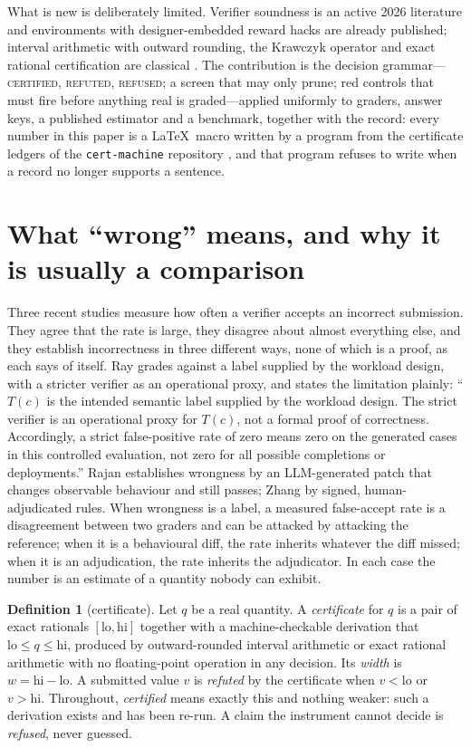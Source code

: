 \documentclass[11pt]{article}
\theoremstyle{definition}
\newtheorem{definition}{Definition}
\newcommand{\lo}{\mathrm{lo}}
\newcommand{\hi}{\mathrm{hi}}
\newcommand{\verdict}[1]{\textsc{#1}}
\begin{document}
What is new is deliberately limited. Verifier soundness is an active 2026 literature \cite{Rajan26,Zhang26,Gaming26,Ray26} and environments with designer-embedded reward hacks are already published; interval arithmetic with outward rounding, the Krawczyk operator and exact rational certification are classical \cite{Krawczyk69,Moore09,Rump10}. The contribution is the decision grammar---\verdict{certified}, \verdict{refuted}, \verdict{refused}; a screen that may only prune; red controls that must fire before anything real is graded---applied uniformly to graders, answer keys, a published estimator and a benchmark, together with the record: every number in this paper is a \LaTeX\ macro written by a program from the certificate ledgers of the \texttt{cert-machine} repository \cite{CM}, and that program refuses to write when a record no longer supports a sentence.

\section{What ``wrong'' means, and why it is usually a comparison}\label{sec:wrong}

Three recent studies measure how often a verifier accepts an incorrect submission. They agree that the rate is large, they disagree about almost everything else, and they establish incorrectness in three different ways, none of which is a proof, as each says of itself. Ray \cite{Ray26} grades against a label supplied by the workload design, with a stricter verifier as an operational proxy, and states the limitation plainly: ``$T(c)$ is the intended semantic label supplied by the workload design. The strict verifier is an operational proxy for $T(c)$, not a formal proof of correctness. Accordingly, a strict false-positive rate of zero means zero on the generated cases in this controlled evaluation, not zero for all possible completions or deployments.'' Rajan \cite{Rajan26} establishes wrongness by an LLM-generated patch that changes observable behaviour and still passes; Zhang \cite{Zhang26} by signed, human-adjudicated rules. When wrongness is a label, a measured false-accept rate is a disagreement between two graders and can be attacked by attacking the reference; when it is a behavioural diff, the rate inherits whatever the diff missed; when it is an adjudication, the rate inherits the adjudicator. In each case the number is an estimate of a quantity nobody can exhibit.

\begin{definition}[certificate]\label{def:cert}
Let $q$ be a real quantity. A \emph{certificate} for $q$ is a pair of exact rationals $[\lo,\hi]$ together with a machine-checkable derivation that $\lo\le q\le\hi$, produced by outward-rounded interval arithmetic or exact rational arithmetic with no floating-point operation in any decision. Its \emph{width} is $w=\hi-\lo$. A submitted value $v$ is \emph{refuted} by the certificate when $v<\lo$ or $v>\hi$. Throughout, \emph{certified} means exactly this and nothing weaker: such a derivation exists and has been re-run. A claim the instrument cannot decide is \emph{refused}, never guessed.
\end{definition}
\end{document}
